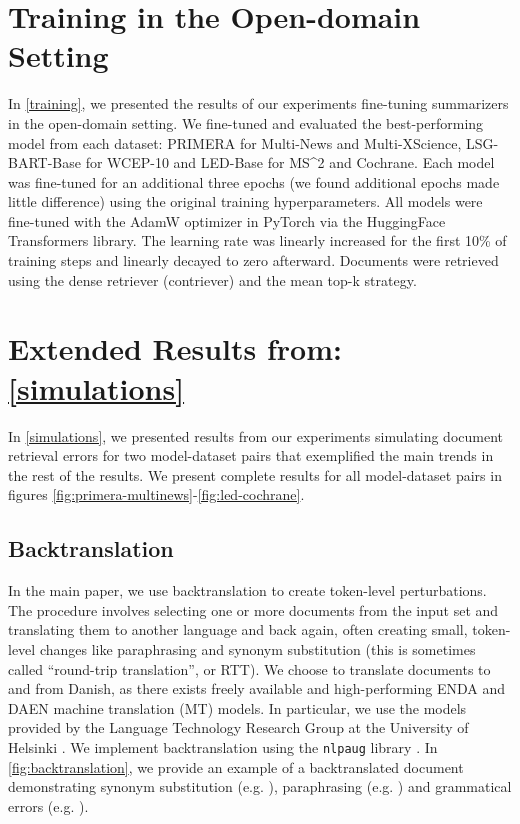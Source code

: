 \documentclass[11pt]{article}
\newcommand\mstoo{{MS\^{}2}\xspace}
\begin{document}
\section{Training in the Open-domain Setting}
\label{appendix:training}

In \textsection \ref{training}, we presented the results of our experiments fine-tuning summarizers in the open-domain setting. We fine-tuned and evaluated the best-performing model from each dataset: PRIMERA for Multi-News and Multi-XScience, LSG-BART-Base for WCEP-10 and LED-Base for \mstoo and Cochrane. Each model was fine-tuned for an additional three epochs (we found additional epochs made little difference) using the original training hyperparameters. All models were fine-tuned with the AdamW optimizer \citep{Loshchilov2019DecoupledWD} in PyTorch via the HuggingFace Transformers library. The learning rate was linearly increased for the first 10\% of training steps and linearly decayed to zero afterward. Documents were retrieved using the dense retriever (contriever) and the mean top-k strategy.

\section{Extended Results from: \autoref{simulations}}
\label{appendix:perturbations}

In \textsection \ref{simulations}, we presented results from our experiments simulating document retrieval errors for two model-dataset pairs that exemplified the main trends in the rest of the results. We present complete results for all model-dataset pairs in figures \ref{fig:primera-multinews}-\ref{fig:led-cochrane}.

\subsection{Backtranslation}
\label{appendix:backtranslation}

In the main paper, we use backtranslation to create token-level perturbations. The procedure involves selecting one or more documents from the input set and translating them to another language and back again, often creating small, token-level changes like paraphrasing and synonym substitution (this is sometimes called ``round-trip translation'', or RTT). We choose to translate documents to and from Danish, as there exists freely available and high-performing EN\textrightarrow DA and DA\textrightarrow EN machine translation (MT) models. In particular, we use the models provided by the Language Technology Research Group at the University of Helsinki \citep{helsinki}. We implement backtranslation using the \texttt{nlpaug} library \citep{nlpaug}. In \autoref{fig:backtranslation}, we provide an example of a backtranslated document demonstrating synonym substitution (e.g. \textrightarrow {}), paraphrasing (e.g. \textrightarrow {}) and grammatical errors (e.g. ).
\end{document}
